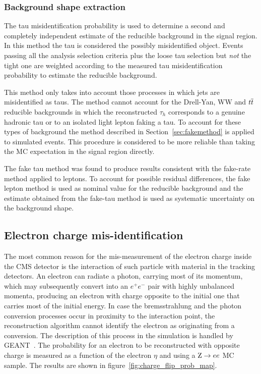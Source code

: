 \subsubsection{Background shape extraction}

The tau misidentification probability is used to determine a second and completely independent estimate of the reducible background in the signal region.
In this method the tau is considered the possibly misidentified object. Events passing all the analysis selection criteria plus the loose tau
selection but \emph{not} the tight one are weighted according to the measured tau misidentification probability to estimate the reducible background.

This method only takes into account those processes in which jets are misidentified as taus. The method cannot account for the Drell-Yan, WW and $t\overline{t}$ reducible backgrounds
in which the reconstructed $\tau_h$ corresponds to a genuine hadronic tau or to an isolated light lepton faking a tau. To account for these types of background the method described in Section~\ref{sec:fakemethod}
is applied to simulated events. This procedure is considered to be more reliable than taking the MC expectation in the signal region directly.

The fake tau method was found to produce results consistent with the fake-rate method applied to leptons. To account for possible residual differences,
the fake lepton method is used as nominal value for the reducible background and the estimate obtained from the fake-tau method is used as systematic uncertainty on the background shape.

\subsection{Electron charge mis-identification}
\label{sec:charge_misid}

The most common reason for the mis-measurement of the electron charge inside the CMS detector is the interaction of such particle with material in the tracking detectors. %
An electron can radiate a photon, carrying most of its momentum, which may subsequently convert into an $e^+e^-$ pair with highly unbalanced momenta, producing an electron with charge opposite to the initial one that carries most of the initial energy. %
In case the bremsstrahlung and the photon conversion processes occur 
in proximity to the interaction point, the reconstruction algorithm cannot identify the electron as originating from a conversion.
The description of this process in the simulation is handled by \textsc{GEANT}~\cite{geant}. The probability for an electron to be reconstructed with opposite charge is measured as a function of the electron $\eta$ and \pT using a $\mathrm{Z} \rightarrow ee$ MC sample. The results are shown in figure~\ref{fig:charge_flip_prob_map}.

